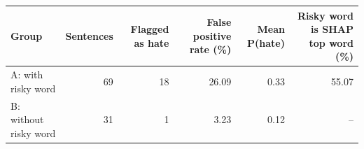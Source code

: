 \begin{tabular}{lrrrrr}
\toprule
Group & Sentences & Flagged as hate & False positive rate (\%) & Mean P(hate) & Risky word is SHAP top word (\%) \\
\midrule
A: with risky word & 69 & 18 & 26.09 & 0.33 & 55.07 \\
B: without risky word & 31 & 1 & 3.23 & 0.12 & -- \\
\bottomrule
\end{tabular}
